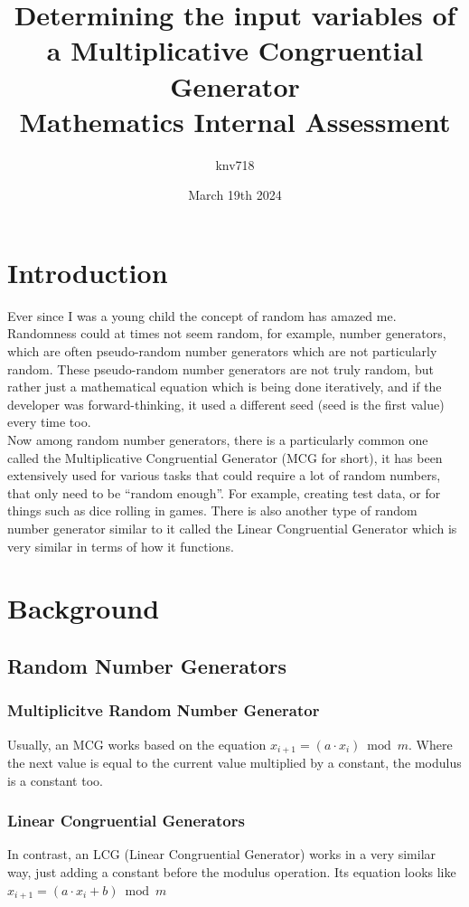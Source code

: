 \documentclass[12pft, english]{article}
\title{%
  Determining the input variables of a Multiplicative Congruential Generator \\
  \large Mathematics Internal Assessment}
\author{knv718}
\date{March 19th 2024}
\begin{document}
\maketitle

\pagebreak

\tableofcontents
\pagebreak

\begin{multicols}{2}
  \section{Introduction}
  Ever since I was a young child the concept of random has amazed me. Randomness could at times not seem random, for example, number generators, which are often pseudo-random number generators which are not particularly random. These pseudo-random number generators are not truly random, but rather just a mathematical equation which is being done iteratively, and if the developer was forward-thinking, it used a different seed (seed is the first value) every time too. \\
  Now among random number generators, there is a particularly common one called the Multiplicative Congruential Generator (MCG for short), it has been extensively used for various tasks that could require a lot of random numbers, that only need to be ``random enough''. For example, creating test data, or for things such as dice rolling in games. There is also another type of random number generator similar to it called the Linear Congruential Generator which is very similar in terms of how it functions.
  \section{Background}
  \subsection{Random Number Generators}
  \subsubsection{Multiplicitve Random Number Generator}
  Usually, an MCG works based on the equation \(x_{i+1} = (a \cdot x_{i}) \bmod m\). Where the next value is equal to the current value multiplied by a constant, the modulus is a constant too. \citep{waterlooMCG} \citep{fallOntoPlanes}
  \subsubsection{Linear Congruential Generators}
  In contrast, an LCG (Linear Congruential Generator) works in a very similar way, just adding a constant before the modulus operation. Its equation looks like \(x_{i+1} = (a \cdot x_{i} +b ) \bmod m\) \citep{waterlooMCG}

\end{multicols}
\end{document}
